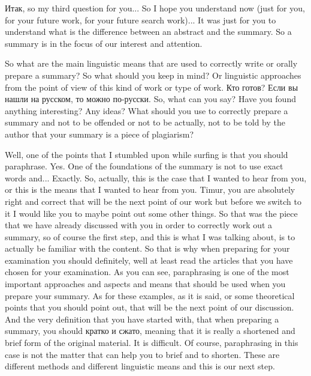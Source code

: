 \documentclass[main.tex]{subfiles}
\begin{document}
Итак, so my third question for you...
So I hope you understand now (just for you, for your future work, for your future search work)...
It was just for you to understand what is the difference between an abstract and the summary.
So a summary is in the focus of our interest and attention.

So what are the main linguistic means that are used to correctly write or orally prepare a summary?
So what should you keep in mind?
Or linguistic approaches from the point of view of this kind of work or type of work.
Кто готов?
Если вы нашли на русском, то можно по-русски.
So, what can you say?
Have you found anything interesting?
Any ideas?
What should you use to correctly prepare a summary and not to be offended or not to be actually, not to be told by the author that your summary is a piece of plagiarism?

Well, one of the points that I stumbled upon while surfing is that you should paraphrase.
Yes.
One of the foundations of the summary is not to use exact words and...
Exactly.
So, actually, this is the case that I wanted to hear from you, or this is the means that I wanted to hear from you.
Timur, you are absolutely right and correct that will be the next point of our work but before we switch to it I would like you to maybe point out some other things.
So that was the piece that we have already discussed with you in order to correctly work out a summary, so of course the first step, and this is what I was talking about, is to actually be familiar with the content.
So that is why when preparing for your examination you should definitely, well at least read the articles that you have chosen for your examination.
As you can see, paraphrasing is one of the most important approaches and aspects and means that should be used when you prepare your summary.
As for these examples, as it is said, or some theoretical points that you should point out, that will be the next point of our discussion.
And the very definition that you have started with, that when preparing a summary, you should кратко и сжато, meaning that it is really a shortened and brief form of the original material.
It is difficult.
Of course, paraphrasing in this case is not the matter that can help you to brief and to shorten.
These are different methods and different linguistic means and this is our next step.
\end{document}
